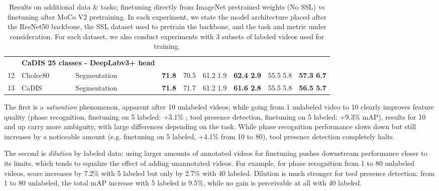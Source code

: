 \documentclass[times,twocolumn,final]{elsarticle}
\begin{document}
\begin{table*}[]
\begin{tabular}{llllcccccc}
& \multicolumn{3}{l}{\textbf{CaDIS 25 classes - DeepLabv3+ head}}&&&&&&\\
12 & \cellcolor[HTML]{C0C0C0}Cholec80    & \cellcolor[HTML]{00D2CB}Segmentation & \cellcolor[HTML]{FFCCC9} & \textbf{71.8} & 70.5 & 61.2  1.9 & \textbf{62.4  2.9} & 55.5  5.8                  & \textbf{57.3  6.7}                     \\
13                                                    & \cellcolor[HTML]{C0C0C0}CaDIS       & \cellcolor[HTML]{00D2CB}Segmentation & \cellcolor[HTML]{FFCCC9}                       & \textbf{71.8}                 & 71.7                 & 61.2  1.9       & \textbf{61.6  2.8} & 55.5  5.8       & \textbf{56.5  5.7} \\\hline
\end{tabular}
\caption{{\color{newtext} Results on additional data \& tasks; finetuning directly from ImageNet pretrained weights (No SSL) vs finetuning after MoCo V2 pretraining. In each experiment, we state the model architecture placed after the ResNet50 backbone, the SSL dataset used to pretrain the backbone, and the task and metric under consideration. For each dataset, we also conduct experiments with 3 subsets of labeled videos used for training.}}

\label{tab:additional_main}
\end{table*}








{\color{changetext}The first is a \textit{saturation} phenomenon, apparent after 10 unlabeled videos; while going from 1 unlabeled video to 10 clearly improves feature quality (phase recognition, finetuning on 5 labeled: +3.1\% ; tool presence detection, finetuning on 5 labeled: +9.3\% mAP), results for 10 and up carry more ambiguity, with large differences depending on the task. While phase recognition performance slows down but still increases by a noticeable amount (e.g. finetuning on 5 labeled, +4.1\%  from 10 to 80), tool presence detection completely halts.}

The second is \textit{dilution} by labeled data: using larger amounts of annotated videos for finetuning pushes downstream performance closer to its limits, which tends to equalize the effect of adding unannotated videos. {\color{changetext}For example, for phase recognition from 1 to 80 unlabeled videos,  score increases by 7.2\% with 5 labeled but only by 2.7\% with 40 labeled. }Dilution is much stronger for tool presence detection: from 1 to 80 unlabeled, the total mAP increase with 5 labeled is \textcolor{changetext}{9.5\%}, while no gain is perceivable at all with 40 labeled.
\end{document}
